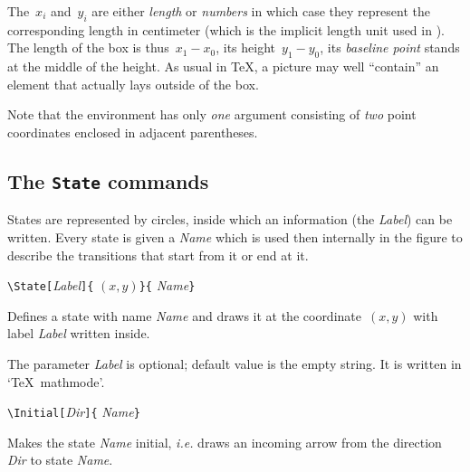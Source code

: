 \documentclass[11pt,twoside]{article}
\newlength{\ColoText}%
\newlength{\ColoFigu}%
\newlength{\parindenttemp} %
\newcommand{\noi}{\noindent}
\newcommand{\ie}{{\itshape i.e.}\xspace }
\newlength{\jsIndent}%
\begin{document}
\medskip

The~$x_{i}$ and~$y_{i}$ are either \emph{length} or \emph{numbers} in 
which case they represent the corresponding length in centimeter (which 
is the implicit length unit used in \VCSG).
The length of the box is thus~$x_{1}-x_{0}$, its 
height~$y_{1}-y_{0}$, its \emph{baseline point} stands at the middle 
of the height.
As usual in \TeX, a picture may well ``contain'' an element that 
actually lays outside of the box.

Note that the environment has only \emph{one} argument consisting of \emph{two} 
point coordinates enclosed in adjacent parentheses.
\subsection{The \texttt{State} commands}\label{subsec.sta}

States are represented by circles, inside which an information (the 
\emph{Label}) can be written.
Every state is given a \emph{Name} which is used then internally in the figure to describe the 
transitions that start from it or end at it.

\noi 
\hspace*{-\jsIndent}
\begin{minipage}[t]{\ColoText}
        \par\vspace*{0mm}%
        \footnotesize
\verb+\State[+\textsl{Label}\verb+]{+%
   $(x,y)$\verb+}{+%
   \textsl{Name}\verb+}+
\normalsize
\end{minipage}%
\hspace*{1.2em}%
\begin{minipage}[t]{\ColoFigu}%
\par\vspace*{0mm}%
Defines a state with name \textsl{Name} and draws it 
at the coordinate~$(x,y)$ with label \textsl{Label} written inside.
\end{minipage}%

\medskip 
\noi 
The parameter \textsl{Label} is optional; default value is the empty 
string.
It is written in `\TeX\ mathmode'.

\medskip 
\noi 
\hspace*{-\jsIndent}
\begin{minipage}[t]{\ColoText}
        \par\vspace*{0mm}%
        \footnotesize
\verb+\Initial[+\textsl{Dir}\verb+]{+%
   \textsl{Name}\verb+}+
\normalsize
\end{minipage}%
\hspace*{1.2em}%
\begin{minipage}[t]{\ColoFigu}%
\par\vspace*{0mm}%
Makes the state \textsl{Name} initial, \ie  draws an incoming arrow 
from the direction \textsl{Dir} to state {\sl Name}.
\end{minipage}%
\end{document}
